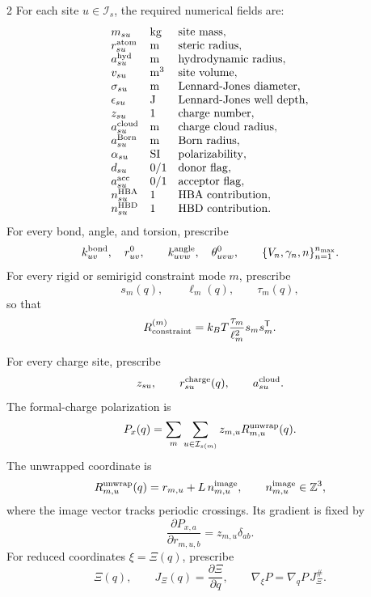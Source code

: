 \documentclass[10pt]{article}
\newcommand{\T}{\mathsf{T}}
\begin{document}
\begin{multicols}{2}
For each site \(u\in\mathcal I_s\), the required numerical fields are:
\[
\begin{array}{lll}
m_{su} & {\rm kg} & {\rm site\ mass},\\
r_{su}^{\rm atom} & {\rm m} & {\rm steric\ radius},\\
a_{su}^{\rm hyd} & {\rm m} & {\rm hydrodynamic\ radius},\\
v_{su} & {\rm m^3} & {\rm site\ volume},\\
\sigma_{su} & {\rm m} & {\rm Lennard\text{-}Jones\ diameter},\\
\epsilon_{su} & {\rm J} & {\rm Lennard\text{-}Jones\ well\ depth},\\
z_{su} & 1 & {\rm charge\ number},\\
a_{su}^{\rm cloud} & {\rm m} & {\rm charge\ cloud\ radius},\\
a_{su}^{\rm Born} & {\rm m} & {\rm Born\ radius},\\
\alpha_{su} & {\rm SI} & {\rm polarizability},\\
d_{su} & 0/1 & {\rm donor\ flag},\\
a_{su}^{\rm acc} & 0/1 & {\rm acceptor\ flag},\\
n_{su}^{\rm HBA} & 1 & {\rm HBA\ contribution},\\
n_{su}^{\rm HBD} & 1 & {\rm HBD\ contribution}.
\end{array}
\]
For every bond, angle, and torsion, prescribe
\[
k_{uv}^{\rm bond},\quad r_{uv}^0,
\qquad
k_{uvw}^{\rm angle},\quad \theta_{uvw}^0,
\qquad
\{V_n,\gamma_n,n\}_{n=1}^{n_{\max}}.
\]
For every rigid or semirigid constraint mode \(m\), prescribe
\[
s_m(q),\qquad \ell_m(q),\qquad \tau_m(q),
\]
so that
\[
R_{\rm constraint}^{(m)}
=
k_BT\frac{\tau_m}{\ell_m^2}s_ms_m^\T.
\]

For every charge site, prescribe
\[
z_{su},\qquad r_{su}^{\rm charge}(q),\qquad a_{su}^{\rm cloud}.
\]
The formal-charge polarization is
\[
P_x(q)
=
\sum_m\sum_{u\in\mathcal I_{s(m)}}
z_{m,u}R_{m,u}^{\rm unwrap}(q).
\]
The unwrapped coordinate is
\[
R_{m,u}^{\rm unwrap}(q)=r_{m,u}+L\,n_{m,u}^{\rm image},
\qquad
n_{m,u}^{\rm image}\in\mathbb Z^3,
\]
where the image vector tracks periodic crossings. Its gradient is fixed by
\[
\frac{\partial P_{x,a}}{\partial r_{m,u,b}}
=
z_{m,u}\delta_{ab}.
\]
For reduced coordinates \(\xi=\Xi(q)\), prescribe
\[
\Xi(q),\qquad
J_\Xi(q)=\frac{\partial\Xi}{\partial q},
\qquad
\nabla_\xi P=\nabla_qP\,J_\Xi^\#.
\]


\end{multicols}
\end{document}
